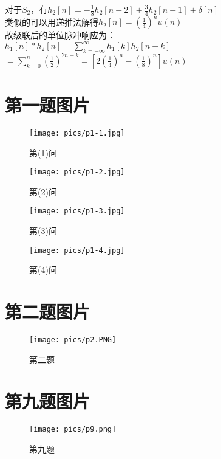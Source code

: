 \documentclass[answers]{exam}
\begin{document}
\begin{questions}
\begin{solution}
\begin{enumerate}[(1)]
	对于$S_2$，有$h_2[n]=-\frac{1}{8}h_2[n-2]+\frac{3}{4}h_2[n-1]+\delta[n]$\\
	类似的可以用递推法解得$h_2[n]=(\frac{1}{4})^nu(n)$\\
	故级联后的单位脉冲响应为：\\
	$h_1[n]*h_2[n]=\sum_{k=-\infty}^{\infty}h_1[k]h_2[n-k]$\\
	$=\sum_{k=0}^{n}(\frac{1}{2})^{2n-k}=[2(\frac{1}{4})^n-(\frac{1}{8})^n]u(n)$
\end{enumerate}
\end{solution}






\end{questions}

\newpage

\begin{appendices}
\section{第一题图片}

\begin{figure}[htbp]
	\centering
    \texttt{[image: pics/p1-1.jpg]}
	\caption{第(1)问}
\end{figure}

\begin{figure}[htbp]
	\centering
    \texttt{[image: pics/p1-2.jpg]}
	\caption{第(2)问}
\end{figure}

\newpage
\begin{figure}[h]
	\centering
    \texttt{[image: pics/p1-3.jpg]}
	\caption{第(3)问}
\end{figure}

\begin{figure}[h]
	\centering
    \texttt{[image: pics/p1-4.jpg]}
	\caption{第(4)问}
\end{figure}

\newpage
\section{第二题图片}
\begin{figure}[htbp]
    \texttt{[image: pics/p2.PNG]}
	\caption{第二题}
\end{figure}

\newpage
\section{第九题图片}
\begin{figure}[htbp]
    \texttt{[image: pics/p9.png]}
	\caption{第九题}
\end{figure}

\end{appendices}
\end{document}
